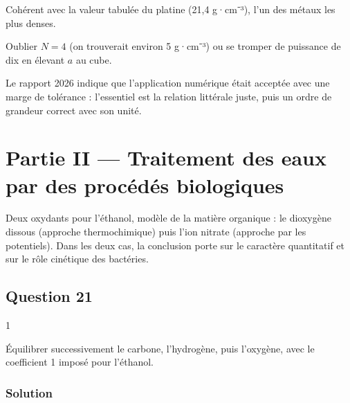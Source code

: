 \documentclass[11pt,a4paper]{article}
\newcommand{\equationajustee}[1]{%
  \sbox{\boiteequation}{$\displaystyle #1$}%
  \ifdim\wd\boiteequation>\linewidth
    \[\resizebox{\linewidth}{!}{\usebox{\boiteequation}}\]%
  \else
    \[#1\]%
  \fi}
\begin{document}
Cohérent avec la valeur tabulée du platine (21,4 g·cm⁻³), l'un des métaux les plus denses.

\begin{piege}

Oublier \(N=4\) (on trouverait environ 5 g·cm⁻³) ou se tromper de puissance de dix en élevant \(a\) au cube.

\end{piege}

\begin{jury}

Le rapport 2026 indique que l'application numérique était acceptée avec une marge de tolérance : l'essentiel est la relation littérale juste, puis un ordre de grandeur correct avec son unité.

\end{jury}

\hypertarget{partie-ii-traitement-des-eaux-par-des-procuxe9duxe9s-biologiques}{%
\section{Partie II --- Traitement des eaux par des procédés biologiques}\label{partie-ii-traitement-des-eaux-par-des-procuxe9duxe9s-biologiques}}

Deux oxydants pour l'éthanol, modèle de la matière organique : le dioxygène dissous (approche thermochimique) puis l'ion nitrate (approche par les potentiels). Dans les deux cas, la conclusion porte sur le caractère quantitatif et sur le rôle cinétique des bactéries.

\hypertarget{question-21}{%
\subsection{Question 21}\label{question-21}}

\begin{indication}{1}

Équilibrer successivement le carbone, l'hydrogène, puis l'oxygène, avec le coefficient 1 imposé pour l'éthanol.

\end{indication}

\hypertarget{solution-20}{%
\subsubsection{Solution}\label{solution-20}}

\equationajustee{\boxed{\mathrm{C_2H_6O_{(aq)}}+3\,\mathrm{O_{2(aq)}}\longrightarrow2\,\mathrm{CO_{2(g)}}+3\,\mathrm{H_2O_{(\ell)}}}}
\end{document}
